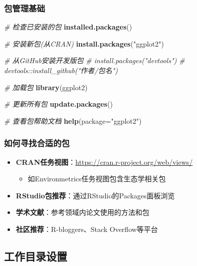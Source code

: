 \documentclass[
]{book}
\newenvironment{Shaded}{\begin{snugshade}}{\end{snugshade}}
\newcommand{\AttributeTok}[1]{\textcolor[rgb]{0.13,0.29,0.53}{#1}}
\newcommand{\CommentTok}[1]{\textcolor[rgb]{0.56,0.35,0.01}{\textit{#1}}}
\newcommand{\FunctionTok}[1]{\textcolor[rgb]{0.13,0.29,0.53}{\textbf{#1}}}
\newcommand{\NormalTok}[1]{#1}
\newcommand{\StringTok}[1]{\textcolor[rgb]{0.31,0.60,0.02}{#1}}
\providecommand{\tightlist}{%
  \setlength{\itemsep}{0pt}\setlength{\parskip}{0pt}}
\begin{document}
\hypertarget{ux5305ux7ba1ux7406ux57faux7840}{%
\subsubsection{包管理基础}\label{ux5305ux7ba1ux7406ux57faux7840}}

\begin{Shaded}
\begin{Highlighting}[]
\CommentTok{\# 检查已安装的包}
\FunctionTok{installed.packages}\NormalTok{()}

\CommentTok{\# 安装新包(从CRAN)}
\FunctionTok{install.packages}\NormalTok{(}\StringTok{"ggplot2"}\NormalTok{) }

\CommentTok{\# 从GitHub安装开发版包}
\CommentTok{\# install.packages("devtools")}
\CommentTok{\# devtools::install\_github("作者/包名")}

\CommentTok{\# 加载包}
\FunctionTok{library}\NormalTok{(ggplot2)}

\CommentTok{\# 更新所有包}
\FunctionTok{update.packages}\NormalTok{()}

\CommentTok{\# 查看包帮助文档}
\FunctionTok{help}\NormalTok{(}\AttributeTok{package=}\StringTok{"ggplot2"}\NormalTok{)}
\end{Highlighting}
\end{Shaded}

\hypertarget{ux5982ux4f55ux5bfbux627eux5408ux9002ux7684ux5305}{%
\subsubsection{如何寻找合适的包}\label{ux5982ux4f55ux5bfbux627eux5408ux9002ux7684ux5305}}

\begin{itemize}
\tightlist
\item
  \textbf{CRAN任务视图}：\url{https://cran.r-project.org/web/views/}

  \begin{itemize}
  \tightlist
  \item
    如Environmetrics任务视图包含生态学相关包
  \end{itemize}
\item
  \textbf{RStudio包推荐}：通过RStudio的Packages面板浏览
\item
  \textbf{学术文献}：参考领域内论文使用的方法和包
\item
  \textbf{社区推荐}：R-bloggers、Stack Overflow等平台
\end{itemize}

\hypertarget{ux5de5ux4f5cux76eeux5f55ux8bbeux7f6e}{%
\subsection{工作目录设置}\label{ux5de5ux4f5cux76eeux5f55ux8bbeux7f6e}}
\end{document}
